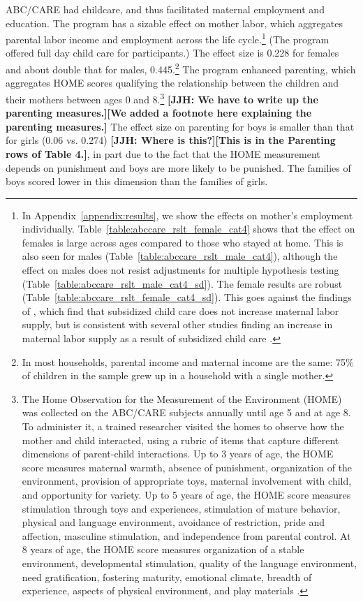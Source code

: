 ABC/CARE had childcare, and thus facilitated maternal employment and education. The program has a sizable effect on mother labor, which aggregates parental labor income and employment across the life cycle.\footnote{In Appendix~\ref{appendix:results}, we show the effects on mother's employment individually. Table~\ref{table:abccare_rslt_female_cat4} shows that the effect on females is large across ages compared to those who stayed at home. This is also seen for males (Table~\ref{table:abccare_rslt_male_cat4}), although the effect on males does not resist adjustments for multiple hypothesis testing (Table~\ref{table:abccare_rslt_male_cat4_sd}). The female results are robust (Table~\ref{table:abccare_rslt_female_cat4_sd}). This goes against the findings of \citet{Havnes_Mogstad_2011_JPE}, which find that subsidized child care does not increase maternal labor supply, but is consistent with several other studies finding an increase in maternal labor supply as a result of subsidized child care \citep{Bauernschuster_Schlotter_2015_JPE,Bettendorf_etal_2015_LE,Geyer_etal_2015_LE,Brilli_etal_2016_REH}.} (The program offered full day child care for participants.) The effect size is 0.228 for females and about double that for males, 0.445.\footnote{In most households, parental income and maternal income are the same: 75\% of children in the sample grew up in a household with a single mother.} The program enhanced parenting, which aggregates HOME scores qualifying the relationship between the children and their mothers between ages 0 and 8.\footnote{The Home Observation for the Measurement of the Environment (HOME) was collected on the ABC/CARE subjects annually until age 5 and at age 8. To administer it, a trained researcher visited the homes to observe how the mother and child interacted, using a rubric of items that capture different dimensions of parent-child interactions. Up to 3 years of age, the HOME score measures maternal warmth, absence of punishment, organization of the environment, provision of appropriate toys, maternal involvement with child, and opportunity for variety. Up to 5 years of age, the HOME score measures stimulation through toys and experiences, stimulation of mature behavior, physical and language environment, avoidance of restriction, pride and affection, masculine stimulation, and independence from parental control. At 8 years of age, the HOME score measures organization of a stable environment, developmental stimulation, quality of the language environment, need gratification, fostering maturity, emotional climate, breadth of experience, aspects of physical environment, and play materials \citep{Bradley-Caldwell_1977_AJMD}.} \textbf{[JJH: We have to write up the parenting measures.][We added a footnote here explaining the parenting measures.]} The effect size on parenting for boys is smaller than that for girls (0.06 vs. 0.274) \textbf{[JJH: Where is this?][This is in the Parenting rows of Table 4.]}, in part due to the fact that the HOME measurement depends on punishment and boys are more likely to be punished. The families of boys scored lower in this dimension than the families of girls.

